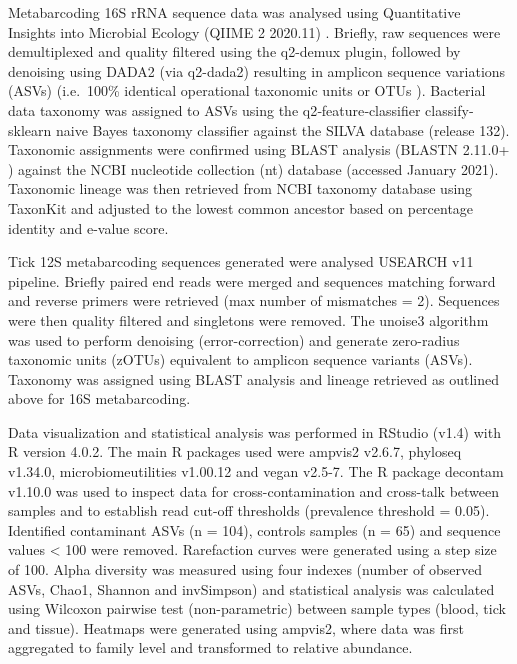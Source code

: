 \documentclass[a4paper, nobind]{templates/ociamthesis}
\begin{document}
Metabarcoding 16S rRNA sequence data was analysed using Quantitative Insights into Microbial Ecology (QIIME 2 2020.11) \autocite{bolyenReproducibleInteractiveScalable2019}. Briefly, raw sequences were demultiplexed and quality filtered using the q2-demux plugin, followed by denoising using DADA2 (via q2-dada2) \autocite{callahanDADA2HighresolutionSample2016} resulting in amplicon sequence variations (ASVs) (i.e.~100\% identical operational taxonomic units or OTUs \autocite{callahanExactSequenceVariants2017}).
Bacterial data taxonomy was assigned to ASVs using the q2‐feature‐classifier \autocite{bokulichOptimizingTaxonomicClassification2018} classify‐sklearn naive Bayes taxonomy classifier against the SILVA database \autocite{quastSILVARibosomalRNA2013} (release 132).
Taxonomic assignments were confirmed using BLAST analysis (BLASTN 2.11.0+ \autocite{zhangGreedyAlgorithmAligning2000,morgulisDatabaseIndexingProduction2008}) against the NCBI nucleotide collection (nt) database (accessed January 2021).
Taxonomic lineage was then retrieved from NCBI taxonomy database using TaxonKit \autocite{weissHostReproductiveCycle2021} and adjusted to the lowest common ancestor based on percentage identity and e-value score.

Tick 12S metabarcoding sequences generated were analysed USEARCH v11 \autocite{edgarSearchClusteringOrders2010} pipeline.
Briefly paired end reads were merged and sequences matching forward and reverse primers were retrieved (max number of mismatches = 2).
Sequences were then quality filtered and singletons were removed.
The unoise3 \autocite{edgarUNOISE2ImprovedErrorcorrection2016} algorithm was used to perform denoising (error-correction) and generate zero-radius taxonomic units (zOTUs) equivalent to amplicon sequence variants (ASVs).
Taxonomy was assigned using BLAST analysis and lineage retrieved as outlined above for 16S metabarcoding.

Data visualization and statistical analysis was performed in RStudio (v1.4) with R version 4.0.2. The main R packages used were ampvis2 v2.6.7, phyloseq v1.34.0, microbiomeutilities v1.00.12 and vegan v2.5-7. The R package decontam v1.10.0 \autocite{davisSimpleStatisticalIdentification2018} was used to inspect data for cross-contamination and cross-talk between samples and to establish read cut-off thresholds (prevalence threshold = 0.05). Identified contaminant ASVs (n = 104), controls samples (n = 65) and sequence values \textless{} 100 were removed. Rarefaction curves were generated using a step size of 100. Alpha diversity was measured using four indexes (number of observed ASVs, Chao1, Shannon and invSimpson) and statistical analysis was calculated using Wilcoxon pairwise test (non-parametric) between sample types (blood, tick and tissue). Heatmaps were generated using ampvis2, where data was first aggregated to family level and transformed to relative abundance.
\end{document}
